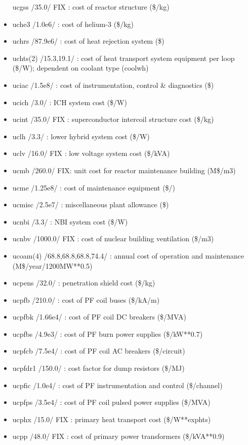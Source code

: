 \documentclass[]{article}
\begin{document}
\begin{itemize}
  ucgss /35.0/ FIX : cost of reactor structure (\$/kg)
\item
  uche3 /1.0e6/ : cost of helium-3 (\$/kg)
\item
  uchrs /87.9e6/ : cost of heat rejection system (\$)
\item
  uchts(2) /15.3,19.1/ : cost of heat transport system equipment per
  loop (\$/W); dependent on coolant type (coolwh)
\item
  uciac /1.5e8/ : cost of instrumentation, control \& diagnostics (\$)
\item
  ucich /3.0/ : ICH system cost (\$/W)
\item
  ucint /35.0/ FIX : superconductor intercoil structure cost (\$/kg)
\item
  uclh /3.3/ : lower hybrid system cost (\$/W)
\item
  uclv /16.0/ FIX : low voltage system cost (\$/kVA)
\item
  ucmb /260.0/ FIX: unit cost for reactor maintenance building (M\$/m3)
\item
  ucme /1.25e8/ : cost of maintenance equipment (\$/)
\item
  ucmisc /2.5e7/ : miscellaneous plant allowance (\$)
\item
  ucnbi /3.3/ : NBI system cost (\$/W)
\item
  ucnbv /1000.0/ FIX : cost of nuclear building ventilation (\$/m3)
\item
  ucoam(4) /68.8,68.8,68.8,74.4/ : annual cost of operation and
  maintenance (M\$/year/1200MW**0.5)
\item
  ucpens /32.0/ : penetration shield cost (\$/kg)
\item
  ucpfb /210.0/ : cost of PF coil buses (\$/kA/m)
\item
  ucpfbk /1.66e4/ : cost of PF coil DC breakers (\$/MVA)
\item
  ucpfbs /4.9e3/ : cost of PF burn power supplies (\$/kW**0.7)
\item
  ucpfcb /7.5e4/ : cost of PF coil AC breakers (\$/circuit)
\item
  ucpfdr1 /150.0/ : cost factor for dump resistors (\$/MJ)
\item
  ucpfic /1.0e4/ : cost of PF instrumentation and control (\$/channel)
\item
  ucpfps /3.5e4/ : cost of PF coil pulsed power supplies (\$/MVA)
\item
  ucphx /15.0/ FIX : primary heat transport cost (\$/W**exphts)
\item
  ucpp /48.0/ FIX : cost of primary power transformers (\$/kVA**0.9)

\end{itemize}
\end{document}
